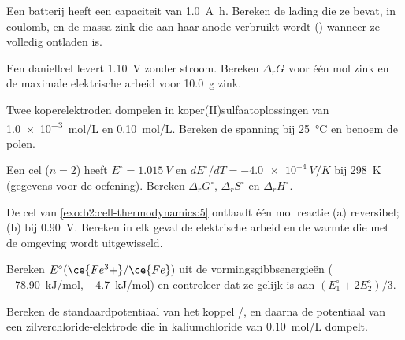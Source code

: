 \begin{exercise}[$\star$]\label{exo:b2:cell-thermodynamics:2}
Een batterij heeft een capaciteit van \qty{1.0}{A.h}. Bereken de lading die ze bevat, in coulomb,
en de massa zink die aan haar anode verbruikt wordt () wanneer ze
volledig ontladen is.
\end{exercise}

\begin{exercise}[$\star$]\label{exo:b2:cell-thermodynamics:3}
Een daniellcel levert \qty{1.10}{V} zonder stroom. Bereken $\Delta_r G$ voor één
mol zink en de maximale elektrische arbeid voor \qty{10.0}{g} zink.
\end{exercise}

\begin{exercise}[$\star$]\label{exo:b2:cell-thermodynamics:4}
Twee koperelektroden dompelen in koper(II)sulfaatoplossingen van \qty{1.0e-3}{mol/L}
en \qty{0.10}{mol/L}. Bereken de spanning bij \qty{25}{\degreeCelsius} en benoem de
polen.
\end{exercise}

\begin{exercise}[$\star\star$]\label{exo:b2:cell-thermodynamics:5}
Een cel ($n = 2$) heeft $E^\circ = \qty{1.015}{V}$ en $dE^\circ/dT = \qty{-4.0e-4}{V/K}$
bij \qty{298}{K} (gegevens voor de oefening). Bereken $\Delta_r G^\circ$, $\Delta_r S^\circ$ en
$\Delta_r H^\circ$.
\end{exercise}

\begin{exercise}[$\star\star$]\label{exo:b2:cell-thermodynamics:6}
De cel van \cref{exo:b2:cell-thermodynamics:5} ontlaadt één mol reactie
(a) reversibel; (b) bij \qty{0.90}{V}. Bereken in elk geval de elektrische arbeid en
de warmte die met de omgeving wordt uitgewisseld.
\end{exercise}

\begin{exercise}[$\star\star$]\label{exo:b2:cell-thermodynamics:7}
Bereken $E^\circ(\ce{Fe^3+}/\ce{Fe})$ uit de vormingsgibbsenergieën
( \qty{-78.90}{kJ/mol},  \qty{-4.7}{kJ/mol}) en controleer dat ze
gelijk is aan $(E_1^\circ + 2E_2^\circ)/3$.
\end{exercise}

\begin{exercise}[$\star\star$]\label{exo:b2:cell-thermodynamics:8}
Bereken de standaardpotentiaal van het koppel /, en daarna de
potentiaal van een zilverchloride-elektrode die in kaliumchloride van \qty{0.10}{mol/L}
dompelt.
\end{exercise}

